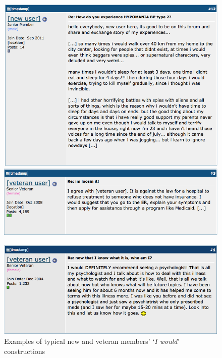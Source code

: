 \begin{figure}[htb]
\centering
\includegraphics[width=1.00\textwidth]{../images/new_member_would.png}
\endminipage\hfill
{}\centering
\includegraphics[width=1.00\textwidth]{../images/veteran_member_would.png}

\raggedright
\includegraphics[width=1.01\textwidth]{../images/vet2would.png}

\endminipage\hfill
\caption[New and veteran members' `\emph{I would}' constructions]{Examples of typical new and veteran members' `\emph{I would}' constructions}
\label{fig:vetmember_would}
\end{figure}

